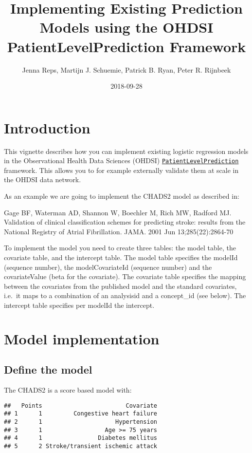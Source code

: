 \documentclass[]{article}
\title{Implementing Existing Prediction Models using the OHDSI
PatientLevelPrediction Framework}
\author{Jenna Reps, Martijn J. Schuemie, Patrick B. Ryan, Peter R. Rijnbeek}
\date{2018-09-28}
\begin{document}
\maketitle

{
\setcounter{tocdepth}{2}
\tableofcontents
}
\section{Introduction}\label{introduction}

This vignette describes how you can implement existing logistic
regression models in the Observational Health Data Sciences (OHDSI)
\href{http://www.github.com/OHDSI/PatientLevelPrediction}{\texttt{PatientLevelPrediction}}
framework. This allows you to for example externally validate them at
scale in the OHDSI data network.

As an example we are going to implement the CHADS2 model as described
in:

Gage BF, Waterman AD, Shannon W, Boechler M, Rich MW, Radford MJ.
Validation of clinical classification schemes for predicting stroke:
results from the National Registry of Atrial Fibrillation. JAMA. 2001
Jun 13;285(22):2864-70

To implement the model you need to create three tables: the model table,
the covariate table, and the intercept table. The model table specifies
the modelId (sequence number), the modelCovariateId (sequence number)
and the covariateValue (beta for the covariate). The covariate table
specifies the mapping between the covariates from the published model
and the standard covariates, i.e.~it maps to a combination of an
analysisid and a concept\_id (see below). The intercept table specifies
per modelId the intercept.

\section{Model implementation}\label{model-implementation}

\subsection{Define the model}\label{define-the-model}

The CHADS2 is a score based model with:

\begin{verbatim}
##   Points                        Covariate
## 1      1         Congestive heart failure
## 2      1                     Hypertension
## 3      1                  Age >= 75 years
## 4      1                Diabetes mellitus
## 5      2 Stroke/transient ischemic attack
\end{verbatim}
\end{document}
